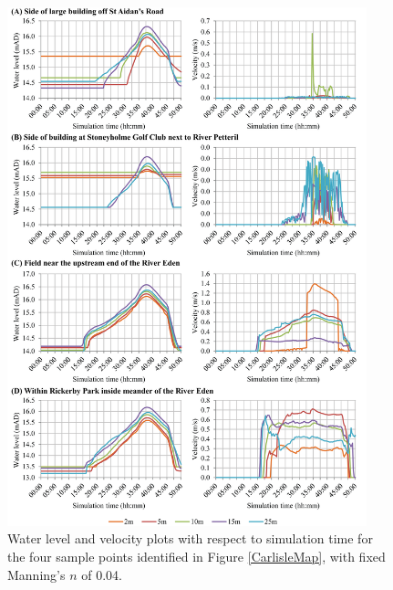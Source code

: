\documentclass[11pt,english,a4paper]{article}
\begin{document}
\begin{figure}[tpb]
\centering
\includegraphics[width=0.93\textwidth]{Figure6.png}
\caption{Water level and velocity plots with respect to simulation time for the four sample points identified in Figure \ref{CarlisleMap}, with fixed Manning's \(n\) of 0.04.}
\label{TimeseriesPlots}
\end{figure}
\end{document}
